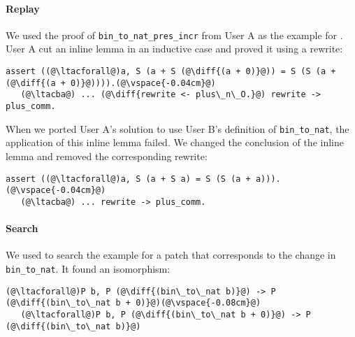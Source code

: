 \paragraph{Replay} We used the proof of \lstinline{bin_to_nat_pres_incr} from User A as the example for \sysname.
User A cut an inline lemma in an inductive case and proved it using a rewrite:

\begin{lstlisting}[language=coq]
   assert ((@\ltacforall@)a, S (a + S (@\diff{(a + 0)}@)) = S (S (a + (@\diff{(a + 0)}@)))).(@\vspace{-0.04cm}@)
   (@\ltacba@) ... (@\diff{rewrite <- plus\_n\_O.}@) rewrite -> plus_comm.
\end{lstlisting} %

When we ported User A's solution to use User B's definition of \lstinline{bin_to_nat}, 
the application of this inline lemma failed. We changed the conclusion of the inline lemma 
and removed the corresponding rewrite:

\begin{lstlisting}[language=coq]
   assert ((@\ltacforall@)a, S (a + S a) = S (S (a + a))).(@\vspace{-0.04cm}@)
   (@\ltacba@) ... rewrite -> plus_comm.
\end{lstlisting} %

\paragraph{Search} We used \sysname to search the example
for a patch that corresponds to the change in \lstinline{bin_to_nat}.
It found an isomorphism:

\begin{lstlisting}[language=coq]
   (@\ltacforall@)P b, P (@\diff{(bin\_to\_nat b)}@) -> P (@\diff{(bin\_to\_nat b + 0)}@)(@\vspace{-0.08cm}@)
   (@\ltacforall@)P b, P (@\diff{(bin\_to\_nat b + 0)}@) -> P (@\diff{(bin\_to\_nat b)}@)
\end{lstlisting}



